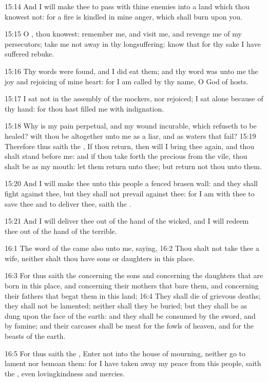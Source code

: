 15:14 And I will make thee to pass with thine enemies into a land which thou knowest not: for a fire is kindled in mine anger, which shall burn upon you.

15:15 O \LORD, thou knowest: remember me, and visit me, and revenge me of my persecutors; take me not away in thy longsuffering: know that for thy sake I have suffered rebuke.

15:16 Thy words were found, and I did eat them; and thy word was unto me the joy and rejoicing of mine heart: for I am called by thy name, O \LORD God of hosts.

15:17 I sat not in the assembly of the mockers, nor rejoiced; I sat alone because of thy hand: for thou hast filled me with indignation.

15:18 Why is my pain perpetual, and my wound incurable, which refuseth to be healed? wilt thou be altogether unto me as a liar, and as waters that fail?  15:19 Therefore thus saith the \LORD, If thou return, then will I bring thee again, and thou shalt stand before me: and if thou take forth the precious from the vile, thou shalt be as my mouth: let them return unto thee; but return not thou unto them.

15:20 And I will make thee unto this people a fenced brasen wall: and they shall fight against thee, but they shall not prevail against thee: for I am with thee to save thee and to deliver thee, saith the \LORD.

15:21 And I will deliver thee out of the hand of the wicked, and I will redeem thee out of the hand of the terrible.

16:1 The word of the \LORD came also unto me, saying, 16:2 Thou shalt not take thee a wife, neither shalt thou have sons or daughters in this place.

16:3 For thus saith the \LORD concerning the sons and concerning the daughters that are born in this place, and concerning their mothers that bare them, and concerning their fathers that begat them in this land; 16:4 They shall die of grievous deaths; they shall not be lamented; neither shall they be buried; but they shall be as dung upon the face of the earth: and they shall be consumed by the sword, and by famine; and their carcases shall be meat for the fowls of heaven, and for the beasts of the earth.

16:5 For thus saith the \LORD, Enter not into the house of mourning, neither go to lament nor bemoan them: for I have taken away my peace from this people, saith the \LORD, even lovingkindness and mercies.

